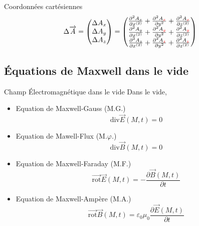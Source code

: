 \begin{Example}{Coordonnées cartésiennes}{}
\begin{equation}
  \Delta \overrightarrow{A} = \begin{pmatrix}
    \Delta A_x \\
    \Delta A_y \\
    \Delta A_z 
  \end{pmatrix} = \begin{pmatrix}
  \frac{\partial ^{2}A_x}{\partial x ^{(2)}} + \frac{\partial ^{2} A_{\color{red} x}}{\partial y^{2}} + \frac{\partial ^{2} A_{\color{red} x}}{\partial z ^{(2)}} \\ 
  \frac{\partial ^{2}A_y}{\partial x ^{(2)}} + \frac{\partial ^{2} A_{\color{red} y}}{\partial y^{2}} + \frac{\partial ^{2} A_{\color{red} y}}{\partial z ^{(2)}} \\ 
  \frac{\partial ^{2}A_z}{\partial x ^{(2)}} + \frac{\partial ^{2} A_{\color{red} z}}{\partial y^{2}} + \frac{\partial ^{2} A_{\color{red} z}}{\partial z ^{(2)}}  
  \end{pmatrix}
\end{equation}
\end{Example}

\subsection{Équations de Maxwell dans le vide} %

\begin{Prop}{Champ Électromagnétique dans le vide}{}
Dans le vide,
\begin{itemize}
    \item Equation de Maxwell-Gauss (M.G.)
        \[
        \mathrm{div} \overrightarrow{E} (M,t) = 0
        \]
    \item Equation de Mawell-Flux (M.$\varphi$.)
        \[
        \mathrm{div} \overrightarrow{B} (M,t) = 0
        \]
    \item Equation de Maxwell-Faraday (M.F.)
        \[
        \overrightarrow{\mathrm{rot}}\overrightarrow{E} (M,t) = - \frac{\partial \overrightarrow{B} (M,t)}{\partial t}  
        \]
    \item Equation de Maxwell-Ampère (M.A.)
        \[
        \overrightarrow{\mathrm{rot} }  \overrightarrow{B} (M,t) = \varepsilon_0\mu_0 \frac{\partial \overrightarrow{E} (M,t)}{\partial t} 
        \]
\end{itemize}
\end{Prop}


